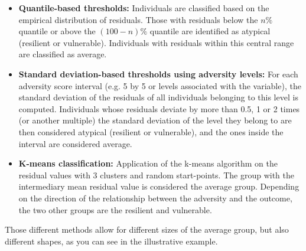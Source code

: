 \documentclass[12pt]{article}
\begin{document}
\begin{itemize}
After fitting the model, we use the \texttt{posterior\_linpred()} function to generate \(S=1000 \) draws from the posterior predictive distribution of the expected outcome for each individual, conditional on their observed adversity level. Specifically, for each \( x_j \), we compute:

\[
\hat{y}_j^{(s)} = \beta_0^{(s)} + \beta_1^{(s)} x_j \quad \text{for } s = 1, \ldots, S\, ,
\]

where \( \hat{y}_j^{(s)} \) is the predicted mean outcome from the \( s \)-th posterior draw. This yields a posterior distribution of expected outcomes for each individual.

To construct individual-level credibility intervals, we compute the empirical \( \alpha/2 \) and \( 1 - \alpha/2 \) quantiles of the \( \hat{y}_j^{(s)} \) values. Individuals whose observed outcome \( y_j \) falls within their corresponding \( 100(1 - \alpha)\% \) posterior credibility interval are classified as average. Those with outcomes outside the interval are classified as either resilient or vulnerable, depending on the direction of the deviation.
\item \textbf{Quantile-based thresholds:} Individuals are classified based on the empirical distribution of residuals. Those with residuals below the \( n\% \) quantile or above the \( (100-n)\% \) quantile are identified as atypical (resilient or vulnerable). Individuals with residuals within this central range are classified as average.

  \item \textbf{Standard deviation-based thresholds using adversity levels:} For each adversity score interval (e.g. 5 by 5 or levels associated with the variable), the standard deviation of the residuals of all individuals belonging to this level is computed. Individuals whose residuals deviate by more than 0.5, 1 or 2 times (or another multiple) the standard deviation of the level they belong to are then considered atypical (resilient or vulnerable), and the ones inside the interval are considered average.
  \item \textbf{K-means classification:} Application of the k-means algorithm on the residual values with 3 clusters and random start-points. The group with the intermediary mean residual value is considered the average group. Depending on the direction of the relationship between the adversity and the outcome, the two other groups are the resilient and vulnerable.
\end{itemize}
Those different methods allow for different sizes of the average group, but also different shapes, as you can see in the illustrative example.
\end{document}
